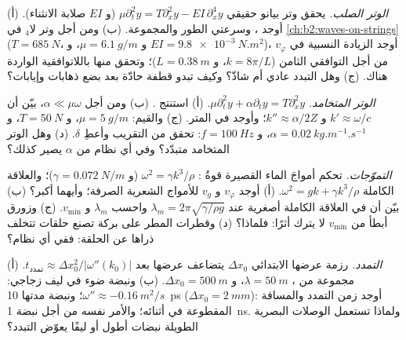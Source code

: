 \begin{exercise}[$\star\star$]\label{exo:b2:dispersion-wave-packets:5}
\emph{الوتر الصلب.} يحقق وتر بيانو حقيقي $\mu\partial_t^2y = T\partial_x^2y
- EI\,\partial_x^4y$ (و $EI$ صلابة الانثناء). (أ) أوجد ،
وسرعتي الطور والمجموعة. (ب) ومن أجل وتر لا$_4$ في
\cref{ch:b2:waves-on-strings} ($T = \qty{685}{N}$، و $\mu = \qty{6.1}{g/m}$، و $EI =
\qty{9.8e-3}{N.m^2}$)، أوجد الزيادة النسبية في $v_\varphi$ من أجل التوافقي
الثامن ($k = 8\pi/L$، و $L = \qty{0.38}{m}$)؛ وتحقق منها باللاتوافقية
الواردة هناك. (ج) وهل التبدد عادي أم شاذّ؟ وكيف تبدو قطفة
حادّة بعد بضع ذهابات وإيابات؟
\end{exercise}

\begin{exercise}[$\star\star$]\label{exo:b2:dispersion-wave-packets:6}
\emph{الوتر المتخامد.} $\mu\partial_t^2y + \alpha\partial_ty = T\partial_x^2y$. (أ) استنتج
. (ب) ومن أجل $\alpha \ll \mu\omega$، بيّن أن $k' \approx \omega/c$ و
$k'' \approx \alpha/2Z$؛ وأوجد   في المتر. (ج) والقيم: $\mu =
\qty{5}{g/m}$، و $T = \qty{50}{N}$، و $\alpha = \qty{0.02}{kg.m^{-1}.s^{-1}}$، و $f =
\qty{100}{Hz}$: تحقق من التقريب وأعطِ $\delta$. (د) وهل الوتر المتخامد
متبدّد؟ وفي أي نظام من $\alpha$ يصير كذلك؟
\end{exercise}

\begin{exercise}[$\star\star$]\label{exo:b2:dispersion-wave-packets:7}
\emph{التموّجات.} تحكم أمواجَ الماء القصيرة قوةُ : $\omega^2 =
\gamma k^3/\rho$ (و $\gamma = \qty{0.072}{N/m}$)؛ والعلاقة الكاملة $\omega^2 = gk +
\gamma k^3/\rho$. (أ) أوجد $v_\varphi$ و $v_g$ للأمواج الشعرية الصرفة؛ وأيهما
أكبر؟ (ب) بيّن أن  في العلاقة الكاملة
أصغرية عند $\lambda_m = 2\pi\sqrt{\gamma/\rho g}$ واحسب $\lambda_m$ و $v_{\min}$.
(ج) وزورق أبطأ من $v_{\min}$ لا يترك أثرًا: فلماذا؟ (د) وقطرات المطر على
بركة تصنع حلقات تتخلف ذراها عن الحلقة: ففي أي نظام؟
\end{exercise}

\begin{exercise}[$\star\star$]\label{exo:b2:dispersion-wave-packets:8}
\emph{التمدد.} رزمة عرضها الابتدائي $\Delta x_0$ يتضاعف عرضها
بعد $t_{\text{تمدد}} \approx \Delta x_0^2/|\omega''(k_0)|$. (أ) مجموعة من ، $\lambda = \qty{50}{m}$، و $\Delta x_0 = \qty{500}{m}$. (ب) ونبضة ضوء في
ليف زجاجي: $\omega'' \approx \qty{-0.16}{m^2/s}$؛ ونبضة مدتها \qty{10}{ps} ($\Delta x_0 =
\qty{2}{mm}$): أوجد زمن التمدد والمسافة المقطوعة في أثنائه؛ والأمر نفسه
من أجل نبضة \qty{1}{ns}. ولماذا تستعمل الوصلات البصرية الطويلة نبضات أطول أو
ليفًا يعوّض التبدد؟
\end{exercise}

